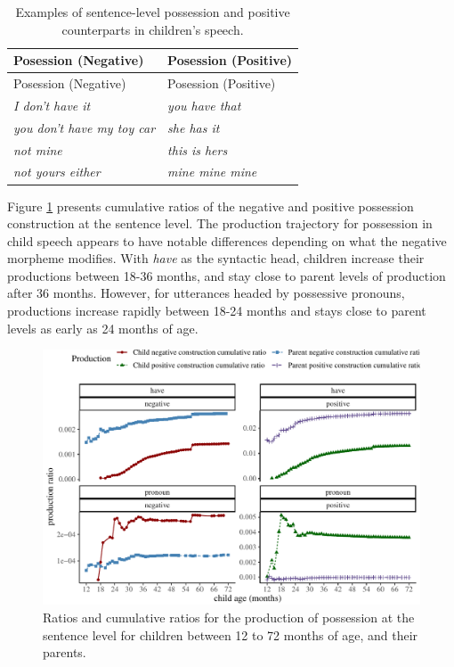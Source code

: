 \documentclass[
  english,
  man,floatsintext]{apa6}
\begin{document}
\begin{longtable}[]{@{}ll@{}}
\caption{\label{tab:possess} Examples of sentence-level possession and positive counterparts in children's speech.}\tabularnewline
\toprule
Posession (Negative) & Posession (Positive) \\
\midrule
\endfirsthead
\toprule
Posession (Negative) & Posession (Positive) \\
\midrule
\endhead
\emph{I don't have it} & \emph{you have that} \\
\emph{you don't have my toy car} & \emph{she has it} \\
\emph{not mine} & \emph{this is hers} \\
\emph{not yours either} & \emph{mine mine mine} \\
\bottomrule
\end{longtable}

Figure \ref{fig:possession} presents cumulative ratios of the negative and positive possession construction at the sentence level. The production trajectory for possession in child speech appears to have notable differences depending on what the negative morpheme modifies. With \emph{have} as the syntactic head, children increase their productions between 18-36 months, and stay close to parent levels of production after 36 months. However, for utterances headed by possessive pronouns, productions increase rapidly between 18-24 months and stays close to parent levels as early as 24 months of age.

\begin{figure}[H]

{\centering \includegraphics{neg_construction_article_files/figure-latex/possession-1} 

}

\caption{Ratios and cumulative ratios for the production of possession at the sentence level for children between 12 to 72 months of age, and their parents.}\label{fig:possession}
\end{figure}
\end{document}
